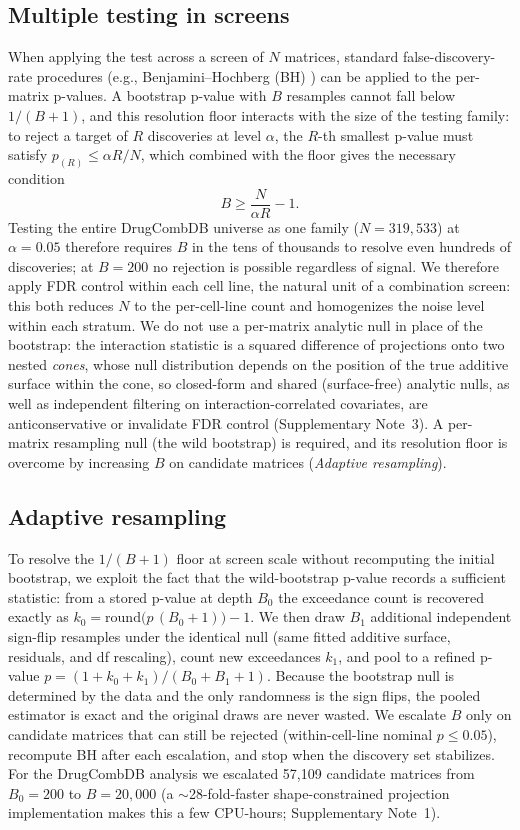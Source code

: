 \documentclass[unnumsec,webpdf,contemporary,large]{oup-authoring-template}
\begin{document}
\subsection{Multiple testing in screens}
When applying the test across a screen of $N$ matrices, standard false-discovery-rate procedures (e.g., Benjamini--Hochberg (BH) \cite{BenjaminiHochberg1995}) can be applied to the per-matrix p-values.
A bootstrap p-value with $B$ resamples cannot fall below $1/(B+1)$, and this resolution floor interacts with the size of the testing family: to reject a target of $R$ discoveries at level $\alpha$, the $R$-th smallest p-value must satisfy $p_{(R)} \le \alpha R/N$, which combined with the floor gives the necessary condition
\begin{equation}
B \ge \frac{N}{\alpha R} - 1.
\label{eq:bmin}
\end{equation}
Testing the entire DrugCombDB universe as one family ($N=319{,}533$) at $\alpha=0.05$ therefore requires $B$ in the tens of thousands to resolve even hundreds of discoveries; at $B=200$ no rejection is possible regardless of signal.
We therefore apply FDR control within each cell line, the natural unit of a combination screen: this both reduces $N$ to the per-cell-line count and homogenizes the noise level within each stratum.
We do not use a per-matrix analytic null in place of the bootstrap: the interaction statistic is a squared difference of projections onto two nested \emph{cones}, whose null distribution depends on the position of the true additive surface within the cone, so closed-form and shared (surface-free) analytic nulls, as well as independent filtering on interaction-correlated covariates, are anticonservative or invalidate FDR control (Supplementary Note~3). A per-matrix resampling null (the wild bootstrap) is required, and its resolution floor is overcome by increasing $B$ on candidate matrices (\emph{Adaptive resampling}).

\subsection{Adaptive resampling}
To resolve the $1/(B+1)$ floor at screen scale without recomputing the initial bootstrap, we exploit the fact that the wild-bootstrap p-value records a sufficient statistic: from a stored p-value at depth $B_0$ the exceedance count is recovered exactly as $k_0 = \mathrm{round}\!\big(p\,(B_0+1)\big) - 1$.
We then draw $B_1$ additional independent sign-flip resamples under the identical null (same fitted additive surface, residuals, and df rescaling), count new exceedances $k_1$, and pool to a refined p-value $p = (1 + k_0 + k_1)/(B_0 + B_1 + 1)$.
Because the bootstrap null is determined by the data and the only randomness is the sign flips, the pooled estimator is exact and the original draws are never wasted.
We escalate $B$ only on candidate matrices that can still be rejected (within-cell-line nominal $p\le 0.05$), recompute BH after each escalation, and stop when the discovery set stabilizes.
For the DrugCombDB analysis we escalated 57{,}109 candidate matrices from $B_0=200$ to $B=20{,}000$ (a $\sim$28-fold-faster shape-constrained projection implementation makes this a few CPU-hours; Supplementary Note~1).
\end{document}
